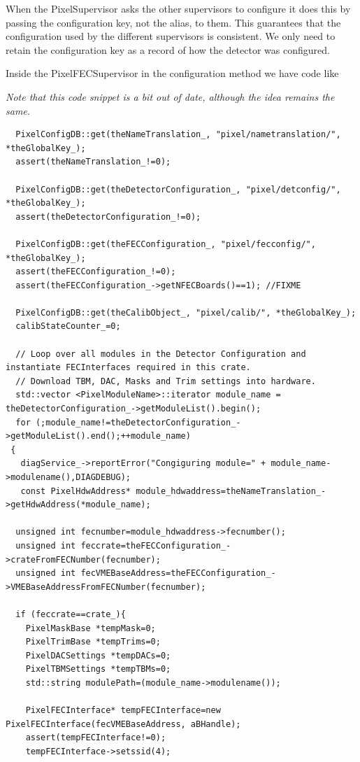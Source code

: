 When the PixelSupervisor asks the other supervisors to configure it does
this by passing the configuration key, not the alias, to them. This
guarantees that the configuration used by the different supervisors 
is consistent. We only need to retain the configuration key as a record
of how the detector was configured.

Inside the PixelFECSupervisor in the configuration method we have code 
like

{\it Note that this code snippet is a bit out of date, although the idea remains the same.}
\begin{verbatim}
  PixelConfigDB::get(theNameTranslation_, "pixel/nametranslation/", *theGlobalKey_);
  assert(theNameTranslation_!=0);

  PixelConfigDB::get(theDetectorConfiguration_, "pixel/detconfig/", *theGlobalKey_);
  assert(theDetectorConfiguration_!=0);

  PixelConfigDB::get(theFECConfiguration_, "pixel/fecconfig/", *theGlobalKey_);
  assert(theFECConfiguration_!=0);
  assert(theFECConfiguration_->getNFECBoards()==1); //FIXME

  PixelConfigDB::get(theCalibObject_, "pixel/calib/", *theGlobalKey_);
  calibStateCounter_=0;

  // Loop over all modules in the Detector Configuration and instantiate FECInterfaces required in this crate.
  // Download TBM, DAC, Masks and Trim settings into hardware.
  std::vector <PixelModuleName>::iterator module_name = theDetectorConfiguration_->getModuleList().begin();
  for (;module_name!=theDetectorConfiguration_->getModuleList().end();++module_name)
 {
   diagService_->reportError("Congiguring module=" + module_name->modulename(),DIAGDEBUG);
   const PixelHdwAddress* module_hdwaddress=theNameTranslation_->getHdwAddress(*module_name);

  unsigned int fecnumber=module_hdwaddress->fecnumber();
  unsigned int feccrate=theFECConfiguration_->crateFromFECNumber(fecnumber);
  unsigned int fecVMEBaseAddress=theFECConfiguration_->VMEBaseAddressFromFECNumber(fecnumber);

  if (feccrate==crate_){
    PixelMaskBase *tempMask=0;
    PixelTrimBase *tempTrims=0;
    PixelDACSettings *tempDACs=0;
    PixelTBMSettings *tempTBMs=0;
    std::string modulePath=(module_name->modulename());

    PixelFECInterface* tempFECInterface=new PixelFECInterface(fecVMEBaseAddress, aBHandle);
    assert(tempFECInterface!=0);
    tempFECInterface->setssid(4);


\end{verbatim}
